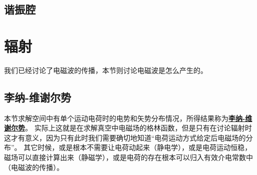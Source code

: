 \documentclass[UTF8, a4paper]{ctexart}
\newcommand*{\concept}[1]{\underline{\textbf{#1}}}
\begin{document}
\subsection{谐振腔}



\section{辐射}

我们已经讨论了电磁波的传播，本节则讨论电磁波是怎么产生的。

\subsection{李纳-维谢尔势}

本节求解空间中有单个运动电荷时的电势和矢势分布情况，所得结果称为\concept{李纳-维谢尔势}。
实际上这就是在求解真空中电磁场的格林函数，但是只有在讨论辐射时这才有意义，因为只有此时我们需要确切地知道“电荷运动方式给定后电磁场的分布”。
其它时候，或是根本不需要让电荷动起来（静电学），或是电荷运动恒稳，磁场可以直接计算出来（静磁学），或是电荷的存在根本可以归入有效介电常数中（电磁波的传播）。
\end{document}
